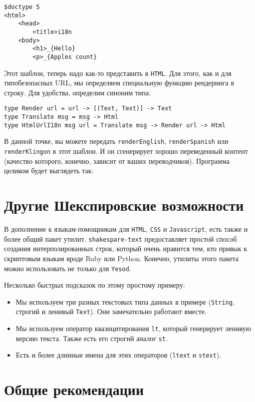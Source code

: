 \begin{lstlisting}
$doctype 5
<html>
    <head>
        <title>i18n
    <body>
        <h1>_{Hello}
        <p>_{Apples count}
\end{lstlisting}

Этот шаблон, теперь надо как-то представить в \texttt{HTML}.  Для этого, как и для типобезопасных URL,
мы определяем специальную функцию рендеринга в строку.
Для удобства, определим синоним типа:

\begin{lstlisting}
type Render url = url -> [(Text, Text)] -> Text
type Translate msg = msg -> Html
type HtmlUrlI18n msg url = Translate msg -> Render url -> Html
\end{lstlisting}

В данной точке, вы можете передать \lstinline!renderEnglish!,
\lstinline!renderSpanish! или \lstinline!renderKlingon! в этот шаблон. И он
сгенерирует хорошо переведенный контент (качество которого, конечно, зависит от
ваших переводчиков). Программа целиком будет выглядеть так:


\section{Другие Шекспировские возможности}

В дополнение к языкам-помощникам для \texttt{HTML}, \texttt{CSS} и \texttt{Javascript}, есть также и более
общий пакет утилит. \lstinline!shakespare-text! предоставляет простой способ
создания интерполированных строк, который очень нравится тем, кто привык к
скриптовым языкам вроде Ruby или Python. Конечно, утилиты этого пакета можно
использовать не только для \texttt{Yesod}.


Несколько быстрых подсказок по этому простому примеру:
\begin{itemize}
\item Мы используем три разных текстовых типа данных в примере
(\lstinline!String!, строгий и ленивый \lstinline!Text!). Они замечательно
работают вместе.
\item Мы используем оператор квазицитирования \lstinline!lt!, который генерирует
ленивую версию текста. Также есть его строгий аналог \lstinline!st!.
\item Есть и более длинные имена для этих операторов
(\lstinline!ltext! и \lstinline!stext!).
\end{itemize}

\section{Общие рекомендации}

